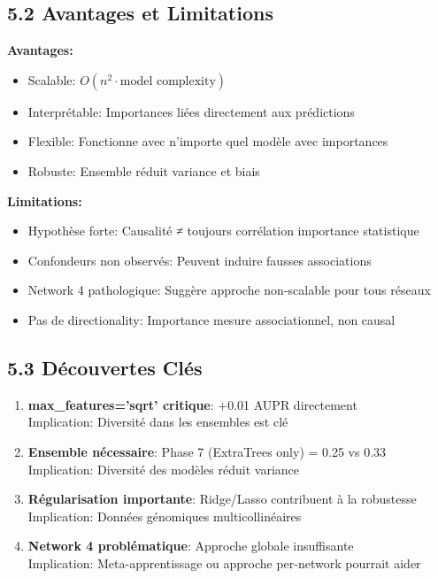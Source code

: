 \documentclass[12pt,a4paper,french]{article}
\begin{document}
\subsection{5.2 Avantages et Limitations}

\textbf{Avantages:}
\begin{itemize}
    \item Scalable: $O(n^2 \cdot \text{model complexity})$
    \item Interprétable: Importances liées directement aux prédictions
    \item Flexible: Fonctionne avec n'importe quel modèle avec importances
    \item Robuste: Ensemble réduit variance et biais
\end{itemize}

\textbf{Limitations:}
\begin{itemize}
    \item Hypothèse forte: Causalité ≠ toujours corrélation importance statistique
    \item Confondeurs non observés: Peuvent induire fausses associations
    \item Network 4 pathologique: Suggère approche non-scalable pour tous réseaux
    \item Pas de directionality: Importance mesure associationnel, non causal
\end{itemize}

\subsection{5.3 Découvertes Clés}

\begin{enumerate}
    \item \textbf{max\_features='sqrt' critique}: +0.01 AUPR directement
    \\ Implication: Diversité dans les ensembles est clé
    
    \item \textbf{Ensemble nécessaire}: Phase 7 (ExtraTrees only) = 0.25 vs 0.33
    \\ Implication: Diversité des modèles réduit variance
    
    \item \textbf{Régularisation importante}: Ridge/Lasso contribuent à la robustesse
    \\ Implication: Données génomiques multicollinéaires
    
    \item \textbf{Network 4 problématique}: Approche globale insuffisante
    \\ Implication: Meta-apprentissage ou approche per-network pourrait aider
\end{enumerate}
\end{document}
